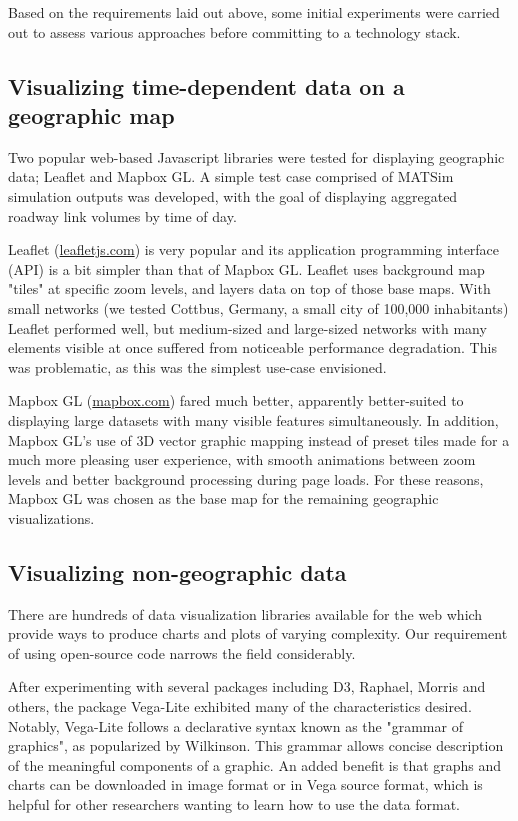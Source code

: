 \documentclass[Afour,sagev,times]{sagej}
\begin{document}
Based on the requirements laid out above, some initial experiments were carried out to assess various approaches before committing to a technology stack.

\subsection{Visualizing time-dependent data on a geographic map}

Two popular web-based Javascript libraries were tested for displaying geographic data; Leaflet and Mapbox GL. A simple test case comprised of MATSim simulation outputs was developed, with the goal of displaying aggregated roadway link volumes by time of day.

Leaflet (\url{leafletjs.com}) is very popular and its application programming interface (API) is a bit simpler than that of Mapbox GL. Leaflet uses background map "tiles" at specific zoom levels, and layers data on top of those base maps. With small networks (we tested Cottbus, Germany, a small city of 100,000 inhabitants) Leaflet performed well, but medium-sized and large-sized networks with many elements visible at once suffered from noticeable performance degradation. This was problematic, as this was the simplest use-case envisioned.

Mapbox GL (\url{mapbox.com}) fared much better, apparently better-suited to displaying large datasets with many visible features simultaneously. In addition, Mapbox GL's use of 3D vector graphic mapping instead of preset tiles made for a much more pleasing user experience, with smooth animations between zoom levels and better background processing during page loads. For these reasons, Mapbox GL was chosen as the base map for the remaining geographic visualizations.

\subsection{Visualizing non-geographic data}

There are hundreds of data visualization libraries available for the web which provide ways to produce charts and plots of varying complexity. Our requirement of using open-source code narrows the field considerably.

After experimenting with several packages including D3, Raphael, Morris and others, the package Vega-Lite\cite{R5} exhibited many of the characteristics desired. Notably, Vega-Lite follows a declarative syntax known as the "grammar of graphics", as popularized by Wilkinson\cite{R6}. This grammar allows concise description of the meaningful components of a graphic. An added benefit is that graphs and charts can be downloaded in image format or in Vega source format, which is helpful for other researchers wanting to learn how to use the data format.
\end{document}
